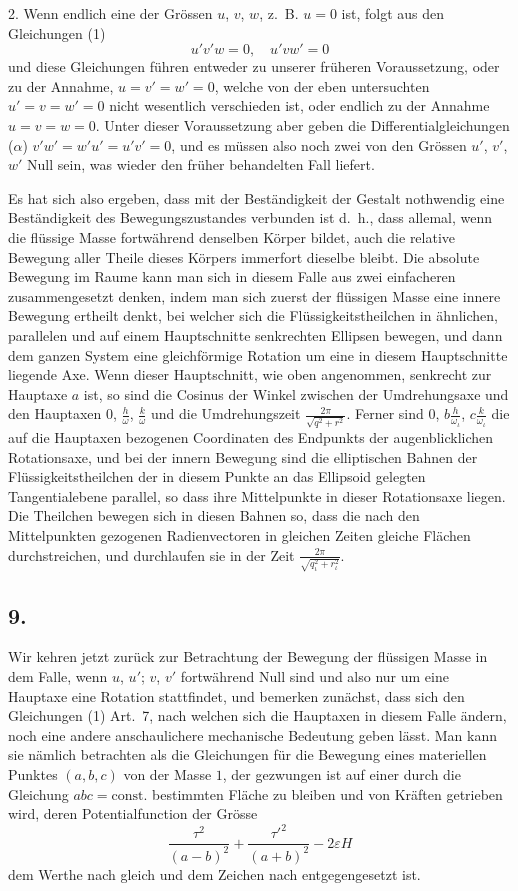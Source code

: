 \documentclass[12pt,a4paper]{article}
\begin{document}
2. Wenn endlich eine der Grössen $u$, $v$, $w$, z.~B. $u = 0$ ist, folgt aus den Gleichungen (1)
\[ u'v'w = 0,\quad u'vw' = 0 \]
und diese Gleichungen führen entweder zu unserer früheren Voraussetzung, oder zu der Annahme, $u = v' = w' = 0$, welche von der eben untersuchten $u' = v = w' = 0$ nicht wesentlich verschieden ist, oder endlich zu der Annahme $u = v = w = 0$. Unter dieser Voraussetzung aber geben die Differentialgleichungen ($\alpha$) $v'w' = w'u' = u'v' = 0$, und es müssen also noch zwei von den Grössen $u'$, $v'$, $w'$ Null sein, was wieder den früher behandelten Fall liefert.

Es hat sich also ergeben, dass mit der Beständigkeit der Gestalt nothwendig eine Beständigkeit des Bewegungszustandes verbunden ist d.~h., dass allemal, wenn die flüssige Masse fortwährend denselben Körper bildet, auch die relative Bewegung aller Theile dieses Körpers immerfort dieselbe bleibt. Die absolute Bewegung im Raume kann man sich in diesem Falle aus zwei einfacheren zusammengesetzt denken, indem man sich zuerst der flüssigen Masse eine innere Bewegung ertheilt denkt, bei welcher sich die Flüssigkeitstheilchen in ähnlichen, parallelen und auf einem Hauptschnitte senkrechten Ellipsen bewegen, und dann dem ganzen System eine gleichförmige Rotation um eine in diesem Hauptschnitte liegende Axe. Wenn dieser Hauptschnitt, wie oben angenommen, senkrecht zur Hauptaxe $a$ ist, so sind die Cosinus der Winkel zwischen der Umdrehungsaxe und den Hauptaxen $0$, $\frac{h}{\omega}$, $\frac{k}{\omega}$ und die Umdrehungszeit $\frac{2\pi}{\sqrt{q^2+r^2}}$. Ferner sind $0$, $b\frac{h}{\omega_\iota}$, $c\frac{k}{\omega_\iota}$ die auf die Hauptaxen bezogenen Coordinaten des Endpunkts der augenblicklichen Rotationsaxe, und bei der innern Bewegung sind die elliptischen Bahnen der Flüssigkeitstheilchen der in diesem Punkte an das Ellipsoid gelegten Tangentialebene parallel, so dass ihre Mittelpunkte in dieser Rotationsaxe liegen. Die Theilchen bewegen sich in diesen Bahnen so, dass die nach den Mittelpunkten gezogenen Radienvectoren in gleichen Zeiten gleiche Flächen durchstreichen, und durchlaufen sie in der Zeit $\frac{2\pi}{\sqrt{q_\iota^2 + r_\iota^2}}$.

\subsection*{9.}

Wir kehren jetzt zurück zur Betrachtung der Bewegung der flüssigen Masse in dem Falle, wenn $u$, $u'$; $v$, $v'$ fortwährend Null sind und also nur um eine Hauptaxe eine Rotation stattfindet, und bemerken zunächst, dass sich den Gleichungen (1) Art.~7, nach welchen sich die Hauptaxen in diesem Falle ändern, noch eine andere anschaulichere mechanische Bedeutung geben lässt. Man kann sie nämlich betrachten als die Gleichungen für die Bewegung eines materiellen Punktes $(a, b, c)$ von der Masse $1$, der gezwungen ist auf einer durch die Gleichung $abc = \text{const.}$ bestimmten Fläche zu bleiben und von Kräften getrieben wird, deren Potentialfunction der Grösse
\[ \frac{\tau^2}{(a-b)^2} + \frac{\tau'^2}{(a+b)^2} - 2\varepsilon H \]
dem Werthe nach gleich und dem Zeichen nach entgegengesetzt ist.
\end{document}
